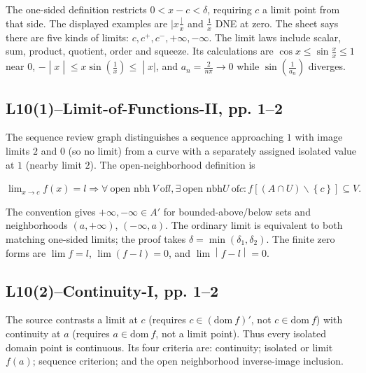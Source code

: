 The one-sided definition restricts \(0 < x - c < \delta\), requiring \(c\) a limit point from that side. The displayed examples are \(|x\frac{|}{x}\) and \(\frac{1}{x}\) DNE at zero. The sheet says there are five kinds of limits: \(c,c^{+},c^{-}, + \infty, - \infty\). The limit laws include scalar, sum, product, quotient, order and squeeze. Its calculations are \(\cos x \leq \sin\frac{x}{x} \leq 1\) near \(0\), \(\left. - \middle| x \middle| \leq x\sin\left( \frac{1}{x} \right) \leq \middle| x| \right.\), and \(a_{n} = \frac{2}{n\pi}\rightarrow 0\) while \(\sin\left( \frac{1}{a_{n}} \right)\) diverges.

\subsection{L10(1)--Limit-of-Functions-II, pp. 1--2}

The sequence review graph distinguishes a sequence approaching \(1\) with image limits \(2\) and \(0\) (so no limit) from a curve with a separately assigned isolated value at \(1\) (nearby limit \(2\)). The open-neighborhood definition is

\(\lim_{x\rightarrow c}f(x) = l\Rightarrow\forall\ \text{open nbh}\ V\ \text{of}l,\exists\ \text{open nbh}U\ \text{of}c:f\left\lbrack {\left( {A \cap U} \right) \smallsetminus \left\{ c \right\}} \right\rbrack \subseteq V.\)

The convention gives \(+ \infty, - \infty \in A'\) for bounded-above/below sets and neighborhoods \(\left( {a, + \infty} \right)\), \(\left( {- \infty,a} \right)\). The ordinary limit is equivalent to both matching one-sided limits; the proof takes \(\delta = \min\left( {\delta_{1},\delta_{2}} \right)\). The finite zero forms are \(\lim f = l\), \(\lim\left( {f - l} \right) = 0\), and \(\left. \lim \middle| f - l \middle| = 0 \right.\).

\subsection{L10(2)--Continuity-I, pp. 1--2}

The source contrasts a limit at \(c\) (requires \(c \in \left( {\text{dom}\ f} \right)'\), not \(c \in \text{dom}\ f\)) with continuity at \(a\) (requires \(a \in \text{dom}\ f\), not a limit point). Thus every isolated domain point is continuous. Its four criteria are: continuity; isolated or limit \(f(a)\); sequence criterion; and the open neighborhood inverse-image inclusion.

